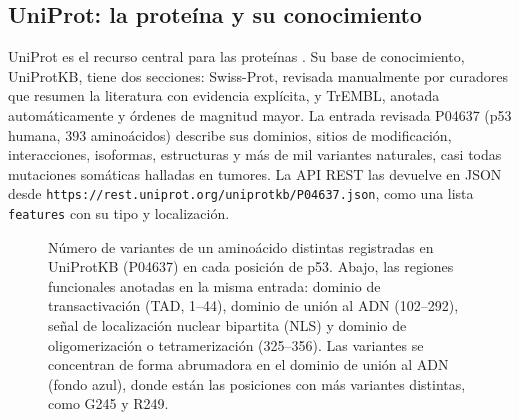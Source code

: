 \subsection{UniProt: la proteína y su conocimiento}

UniProt es el recurso central para las proteínas \parencite{c02-uniprot2025}. Su base de conocimiento, UniProtKB, tiene dos secciones: Swiss-Prot, revisada manualmente por curadores que resumen la literatura con evidencia explícita, y TrEMBL, anotada automáticamente y órdenes de magnitud mayor. La entrada revisada P04637 (p53 humana, 393 aminoácidos) describe sus dominios, sitios de modificación, interacciones, isoformas, estructuras y más de mil variantes naturales, casi todas mutaciones somáticas halladas en tumores. La API REST las devuelve en JSON desde \texttt{https://rest.uniprot.org/uniprotkb/P04637.json}, como una lista \texttt{features} con su tipo y localización.

\begin{figure}[t]
\centering
{}
\caption[Variantes naturales de p53 en UniProt]{Número de variantes de un aminoácido distintas registradas en UniProtKB (P04637) en cada posición de p53. Abajo, las regiones funcionales anotadas en la misma entrada: dominio de transactivación (TAD, 1--44), dominio de unión al ADN (102--292), señal de localización nuclear bipartita (NLS) y dominio de oligomerización o tetramerización (325--356). Las variantes se concentran de forma abrumadora en el dominio de unión al ADN (fondo azul), donde están las posiciones con más variantes distintas, como G245 y R249.}
\label{fig:02-p53var}
\end{figure}

